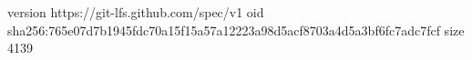 version https://git-lfs.github.com/spec/v1
oid sha256:765e07d7b1945fdc70a15f15a57a12223a98d5acf8703a4d5a3bf6fc7adc7fcf
size 4139
